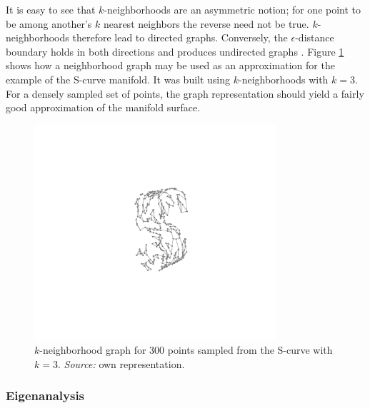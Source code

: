 \begin{minipage}[b]{0.5\textwidth}
  It is easy to see that $k$-neighborhoods are an asymmetric notion; for one 
  point to be among another's $k$ nearest neighbors the reverse need not be 
  true.
  $k$-neighborhoods therefore lead to directed graphs.
  Conversely, the $\epsilon$-distance boundary holds in both directions and 
  produces undirected graphs \citep{heetal2005}.
  Figure \ref{fig-neighbor-graph} shows how a neighborhood graph may be used as 
  an approximation for the example of the S-curve manifold.
  It was built using $k$-neighborhoods with $k = 3$.
  For a densely sampled set of points, the graph representation should yield a 
  fairly good approximation of the manifold surface.
\end{minipage}
\begin{minipage}[b]{0.05\textwidth}
  \phantom{xxx}
\end{minipage}
\begin{minipage}[b]{0.45\textwidth}
  \begin{figure}[H]
    \centering
    \includegraphics[trim = 250 170 200 140, clip, %
      width = 0.8\textwidth]{figures/s-curve-connected}
    \caption[S-curve neighborhood graph]{$k$-neighborhood graph for 300 points 
    sampled from the S-curve with $k = 3$.
    \textit{Source:} own representation.}
    \label{fig-neighbor-graph}
  \end{figure}
\end{minipage}


\subsubsection{Eigenanalysis}
\label{eigenanalysis}

